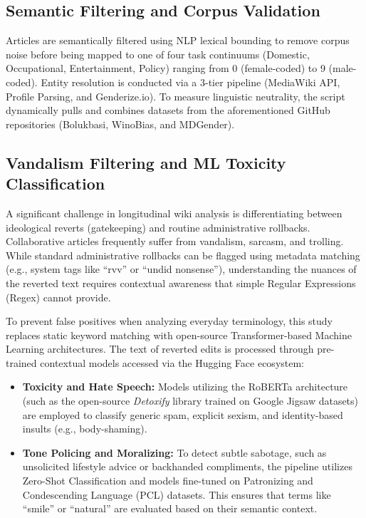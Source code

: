 \documentclass[11pt, a4paper]{article}
\begin{document}
\subsection{Semantic Filtering and Corpus Validation}
Articles are semantically filtered using NLP lexical bounding to remove corpus noise before being mapped to one of four task continuums (Domestic, Occupational, Entertainment, Policy) ranging from 0 (female-coded) to 9 (male-coded). Entity resolution is conducted via a 3-tier pipeline (MediaWiki API, Profile Parsing, and Genderize.io). To measure linguistic neutrality, the script dynamically pulls and combines datasets from the aforementioned GitHub repositories (Bolukbasi, WinoBias, and MDGender).

\subsection{Vandalism Filtering and ML Toxicity Classification}
A significant challenge in longitudinal wiki analysis is differentiating between ideological reverts (gatekeeping) and routine administrative rollbacks. Collaborative articles frequently suffer from vandalism, sarcasm, and trolling. While standard administrative rollbacks can be flagged using metadata matching (e.g., system tags like ``rvv'' or ``undid nonsense''), understanding the nuances of the reverted text requires contextual awareness that simple Regular Expressions (Regex) cannot provide.

To prevent false positives when analyzing everyday terminology, this study replaces static keyword matching with open-source Transformer-based Machine Learning architectures. The text of reverted edits is processed through pre-trained contextual models accessed via the Hugging Face ecosystem:
\begin{itemize}
    \item \textbf{Toxicity and Hate Speech:} Models utilizing the RoBERTa architecture (such as the open-source \textit{Detoxify} library trained on Google Jigsaw datasets) are employed to classify generic spam, explicit sexism, and identity-based insults (e.g., body-shaming).
    \item \textbf{Tone Policing and Moralizing:} To detect subtle sabotage, such as unsolicited lifestyle advice or backhanded compliments, the pipeline utilizes Zero-Shot Classification and models fine-tuned on Patronizing and Condescending Language (PCL) datasets. This ensures that terms like ``smile'' or ``natural'' are evaluated based on their semantic context.
\end{itemize}
\end{document}
